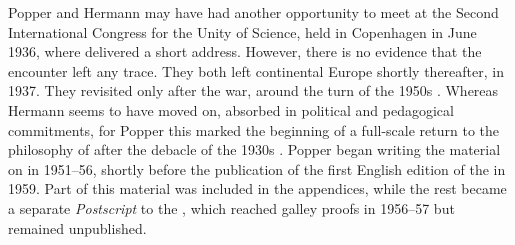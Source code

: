 \documentclass[pdflatex]{sn-jnl}
\newcommand{\Lo}{\bt{Logik}\xspace}
\begin{document}
Popper and Hermann may have had another opportunity to meet at the Second International Congress for the Unity of Science, held in Copenhagen in June 1936, where \citet{Hermann1936} delivered a short address. However, there is no evidence that the encounter left any trace. They both left continental Europe shortly thereafter, in 1937. They revisited \qm only after the war, around the turn of the 1950s \citep{Henry-Hermann1948,Popper1951}. Whereas Hermann seems to have moved on, absorbed in political and pedagogical commitments, for Popper this marked the beginning of a full-scale return to the philosophy of \qm after the debacle of the 1930s \citep{DelSanto2019}. Popper began writing the material on \qm in 1951--56, shortly before the publication of the first English edition of the \Lo in 1959. Part of this material was included in the appendices, while the rest became a separate \textit{Postscript} to the \Lo, which reached galley proofs in 1956--57 but remained unpublished.
\end{document}
